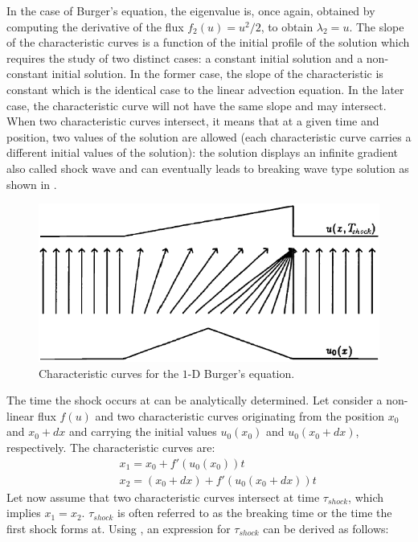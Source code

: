 %
In the case of Burger's equation, the eigenvalue is, once again, obtained by computing the derivative of the flux $f_2(u) = u^2/2$, to obtain $\lambda_2 = u$. The slope of the characteristic curves is a function of the initial profile of the solution which requires the study of two distinct cases: a constant initial solution and a non-constant initial solution. In the former case, the slope of the characteristic is constant which is the identical case to the linear advection equation. In the later case, the characteristic curve will not have the same slope and may intersect. When two characteristic curves intersect, it means that at a given time and position, two values of the solution are allowed (each characteristic curve carries a different initial values of the solution): the solution displays an infinite gradient also called shock wave and can eventually leads to breaking wave type solution as shown in . 
%
\begin{figure}[H]
\centering
\includegraphics[width=\textwidth]{figures/shock_formation_burger.png}
\caption{Characteristic curves for the $1$-D Burger's equation.}
\label{fig:char_curve_bg_sct1b}
\end{figure}
%
The time the shock occurs at can be analytically determined. Let consider a non-linear flux $f(u)$ and two characteristic curves originating from the position $x_0$ and $x_0+dx$ and carrying the initial values $u_0(x_0)$ and $u_0(x_0+dx)$, respectively. The characteristic curves are:
%
\begin{eqnarray}\label{eq:cc1_sct1b}
&&x_1 = x_0 + f'(u_0(x_0)) t \nonumber \\ 
&&x_2 = (x_0 + dx) + f'(u_0(x_0+dx)) t \nonumber 
\end{eqnarray}
%
Let now assume that two characteristic curves intersect at time $\tau_{shock}$, which implies $x_1 = x_2$. $\tau_{shock}$ is often referred to as the breaking time or the time the first shock forms at. Using , an expression for $\tau_{shock}$ can be derived as follows: 
